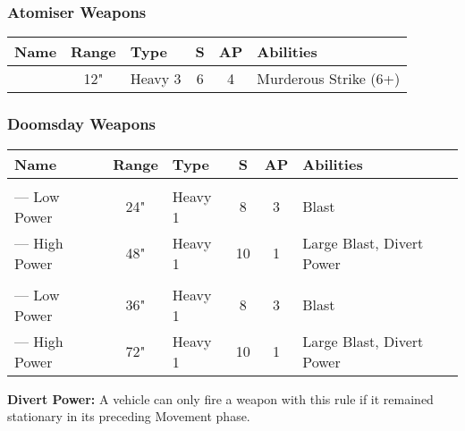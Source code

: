 \section[Wargear]{}


\subsection[Ranged Weapons]{} \label{Ranged Weapons}

\subsubsection{Atomiser Weapons}

\label{Atomiser Beam Lance}
\noindent
\begin{NiceTabular}{L{115 pt} c C{40pt} *{2}{c} >{\raggedright\arraybackslash}p{240pt}}
	Name & Range & Type & S & AP & Abilities \\
	\hline
	 & 12" & Heavy 3 & 6 & 4 & Murderous Strike (6+) \\
\end{NiceTabular}

\subsubsection{Doomsday Weapons} 
\label{Doomsday Cannon} \label{Doomsday Blaster}
\noindent
\begin{NiceTabular}{L{115 pt} c C{40pt} *{2}{c} >{\raggedright\arraybackslash}p{240pt}}
	Name & Range & Type & S & AP & Abilities \\
	\hline
	 & & & & & \\
	— Low Power & 24" & Heavy 1 & 8 & 3 & Blast \\
	— High Power & 48" & Heavy 1 & 10 & 1 & Large Blast, Divert Power \\
	  & & & & & \\
	 — Low Power & 36" & Heavy 1 & 8 & 3 & Blast \\
	 — High Power & 72" & Heavy 1 & 10 & 1 & Large Blast, Divert Power \\
\end{NiceTabular}

\vspace*{1em}
\textbf{Divert Power:} A vehicle can only fire a weapon with this rule if it remained stationary in its preceding Movement phase. 


